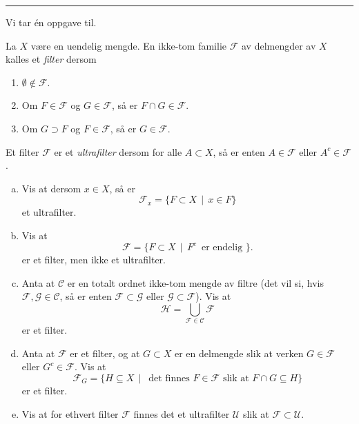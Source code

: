 \documentclass[11pt, norsk]{article}
\begin{document}
\rule{\textwidth}{1pt}

Vi tar én oppgave til.
\begin{oppg}[Eksamen 2013]
  La $X$ være en uendelig mengde. En ikke-tom familie $\mathcal F$ av delmengder av $X$ kalles et \emph{filter} dersom 
  \begin{enumerate}
  \item $\emptyset \not \in \mathcal F$.
\item Om $F \in \mathcal F$ og $G \in \mathcal F$, så er $F \cap G \in \mathcal F$. 
\item Om $G \supset F$ og $F \in \mathcal F$, så er $G \in \mathcal F$.
  \end{enumerate}
Et filter $\mathcal F$ er et \emph{ultrafilter} dersom for alle $A \subset X$, så er enten $A \in \mathcal F$ eller $A^c \in \mathcal F$.
\begin{enumerate}[a)]
\item Vis at dersom $x \in X$, så er 
$$
\mathcal F_x = \{ F \subset X \, \mid \, x \in F \}
$$
et ultrafilter.
\item Vis at 
$$
\mathcal F = \{ F \subset X \, \mid \, F^c \, \text{ er endelig } \}.
$$
er et filter, men ikke et ultrafilter.
\item Anta at $\mathscr C$ er en totalt ordnet ikke-tom mengde av filtre (det vil si, hvis $\mathcal F,\mathcal G \in \mathscr C$, så er enten $\mathcal F \subset \mathcal G$ eller $\mathcal G \subset \mathcal F$). Vis at 
$$
\mathcal H = \bigcup_{\mathcal F \in \mathscr C} \mathcal F
$$
er et filter.
\item Anta at $\mathcal F$ er et filter, og at $G \subset X$ er en delmengde slik at verken $G \in \mathcal F$ eller $G^c \in \mathcal F$. Vis at
$$
\mathcal F_G = \{ H \subseteq X \, \mid \, \text { det finnes } F \in \mathcal F \text{ slik at } F \cap G \subseteq H \}
$$
er et filter.

\item Vis at for ethvert filter $\mathcal F$ finnes det et ultrafilter $\mathscr U$ slik at $\mathcal F \subset \mathscr U$.
\end{enumerate}
\end{oppg}
\end{document}

